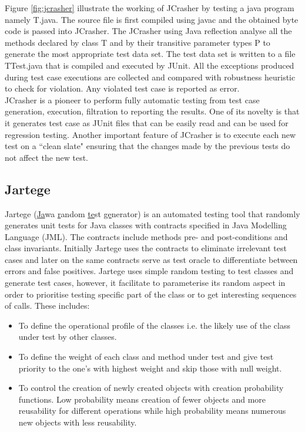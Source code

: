 Figure \ref{fig:jcrasher} illustrate the working of JCrasher by testing a java program namely T.java. The source file is first compiled using javac and the obtained byte code is passed into JCrasher. The JCrasher using Java reflection \cite{chan1999java}  analyse all the methods declared by class T and by their transitive parameter types P to generate the most appropriate test data set. The test data set is written to a file TTest.java that is compiled and executed by JUnit. All the exceptions produced during test case executions are collected and compared with robustness heuristic to check for violation. Any violated test case is reported as error.\\

JCrasher is a pioneer to perform fully automatic testing from test case generation, execution, filtration to reporting the results. One of its novelty  is that it generates test case as JUnit files that can be easily read and can be used for regression testing. Another important feature of JCrasher is to execute each new test on a ``clean slate" ensuring that the changes made by the previous tests do not affect the new test.  



\subsection{Jartege}
Jartege (\uline{Ja}wa \uline{r}andom \uline{te}st \uline{ge}nerator) \cite{Oriat2004} is an automated testing tool that randomly generates unit tests for Java classes with contracts specified in Java Modelling Language (JML). The contracts include methods pre- and post-conditions and class invariants. Initially Jartege uses the contracts to eliminate irrelevant test cases and later on the same contracts serve as test oracle to differentiate between errors and false positives. Jartege uses simple random testing to test classes and generate test cases, however, it facilitate to parameterise its random aspect in order to prioritise testing specific part of the class or to get interesting sequences of calls. These includes: 
\begin{itemize}
\item To define the operational profile of the classes i.e. the likely use of the class under test by other classes.  
\item To define the weight of each class and method under test and give test priority to the one's with highest weight and skip those with null weight.
\item To control the creation of newly created objects with creation probability functions. Low probability means creation of fewer objects and more reusability for different operations while high probability means numerous new objects with less reusability.
\end{itemize}

